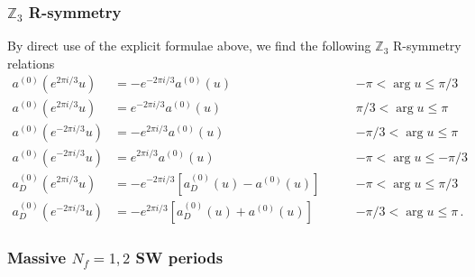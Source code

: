 \documentclass[11pt,a4paper]{elsarticle}
\numberwithin{figure}{section}
\numberwithin{table}{section}
\begin{document}
\subsubsection{$\mathbb{Z}_3 $ R-symmetry}

By direct use of the explicit formulae above, we find the following $\mathbb{Z}_3 $ R-symmetry relations
\begin{equation}
\begin{aligned}  \label{Z3SW}
a^{(0)}(e^{2 \pi i/3} u ) &= - e^{- 2 \pi i/3} a^{(0)}(u) \,\, &-  \pi < \arg u \leq  \pi/3 \\
a^{(0)}(e^{2 \pi i/3} u ) &=  e^{- 2 \pi i/3} a^{(0)}(u) \,\, & \pi/3 < \arg u \leq \pi \\
a^{(0)}(e^{-2 \pi i/3} u )& = - e^{2 \pi i/3} a^{(0)}(u) \,\, &-  \pi /3 < \arg u \leq  \pi  \\
a^{(0)}(e^{-2 \pi i/3} u )& = e^{2 \pi i/3} a^{(0)}(u) \,\, &-  \pi < \arg u \leq - \pi /3\\
a_D^{(0)}(e^{2 \pi i/3} u ) &= - e^{- 2 \pi i/3} \left [ a_D^{(0)}(u) -a^{(0)}(u) \right ]  \qquad &- \pi  < \arg u \leq \pi /3\\
a_D^{(0)}(e^{-2 \pi i/3} u ) &= - e^{ 2 \pi i/3} \left [ a_D^{(0)}(u) + a^{(0)}(u) \right ]  \qquad&-  \pi /3 < \arg u \leq \pi\,.
\end{aligned}
\end{equation}

\subsubsection{Massive $N_f=1,2$ SW periods}
\end{document}
